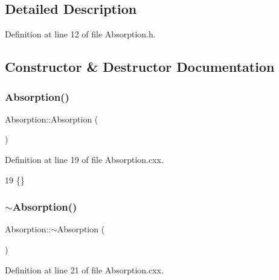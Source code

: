 \subsection{Detailed Description}


Definition at line 12 of file Absorption.\+h.



\subsection{Constructor \& Destructor Documentation}
\mbox{\label{classOscProb_1_1Absorption_a425183cbac1b7ea23a0366733d89a239}} 
\subsubsection{\texorpdfstring{Absorption()}{Absorption()}}
{\footnotesize\ttfamily Absorption\+::\+Absorption (\begin{DoxyParamCaption}{ }\end{DoxyParamCaption})}



Definition at line 19 of file Absorption.\+cxx.


\begin{DoxyCode}
19 \{\}
\end{DoxyCode}
\mbox{\label{classOscProb_1_1Absorption_ab7221ec8a2f72effbbb420aceca3df60}} 
\subsubsection{\texorpdfstring{$\sim$\+Absorption()}{~Absorption()}}
{\footnotesize\ttfamily Absorption\+::$\sim$\+Absorption (\begin{DoxyParamCaption}{ }\end{DoxyParamCaption})\hspace{0.3cm}{\ttfamily [virtual]}}



Definition at line 21 of file Absorption.\+cxx.



